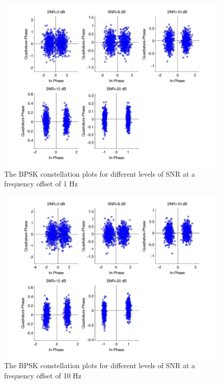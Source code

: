 \documentclass[]{article}
\begin{document}
\begin{figure}[H]
\centering
\hspace*{-2cm}\includegraphics[width=1.3\textwidth]{bpConstfo3.jpg}
\caption{The BPSK constellation plots for different levels of SNR at a frequency offset of 1 Hz}
\end{figure}

\begin{figure}[H]
\centering
\hspace*{-2cm}\includegraphics[width=1.3\textwidth]{bpConstfo4.jpg}
\caption{The BPSK constellation plots for different levels of SNR at a frequency offset of 10 Hz}
\end{figure}
\end{document}
